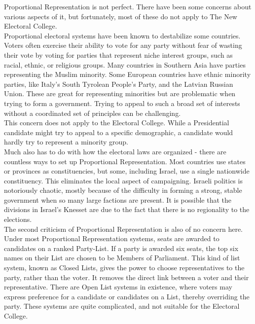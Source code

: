 \documentclass{article}
\begin{document}
    Proportional Representation is not perfect. There have been some concerns about various aspects of it, but fortunately, most of these do not apply to The New Electoral College.\\

    Proportional electoral systems have been known to destabilize some countries. Voters often exercise their ability to vote for any party without fear of wasting their vote by voting for parties that represent niche interest groups, such as racial, ethnic, or religious groups. Many countries in Southern Asia have parties representing the Muslim minority. Some European countries have ethnic minority parties, like Italy's South Tyrolean People's Party, and the Latvian Russian Union. These are great for representing minorities but are problematic when trying to form a government. Trying to appeal to such a broad set of interests without a coordinated set of principles can be challenging.\\

    This concern does not apply to the Electoral College. While a Presidential candidate might try to appeal to a specific demographic, a candidate would hardly try to represent a minority group.\\

    Much also has to do with how the electoral laws are organized - there are countless ways to set up Proportional Representation. Most countries use states or provinces as constituencies, but some, including Israel, use a single nationwide constituency. This eliminates the local aspect of campaigning. Israeli politics is notoriously chaotic, mostly because of the difficulty in forming a strong, stable government when so many large factions are present. It is possible that the divisions in Israel's Knesset are due to the fact that there is no regionality to the elections.\\

    The second criticism of Proportional Representation is also of no concern here. Under most Proportional Representation systems, seats are awarded to candidates on a ranked Party-List. If a party is awarded six seats, the top six names on their List are chosen to be Members of Parliament. This kind of list system, known as Closed Lists, gives the power to choose representatives to the party, rather than the voter. It removes the direct link between a voter and their representative. There are Open List systems in existence, where voters may express preference for a candidate or candidates on a List, thereby overriding the party. These systems are quite complicated, and not suitable for the Electoral College.\\
\end{document}
